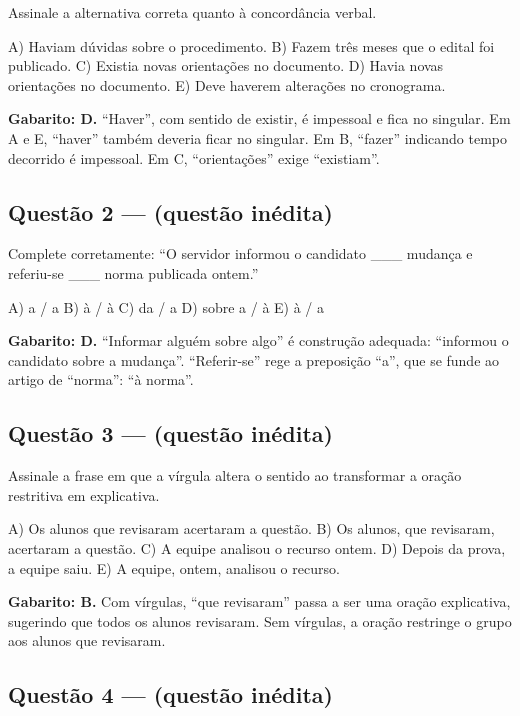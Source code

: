 \documentclass[11pt,a4paper]{article}
\begin{document}
Assinale a alternativa correta quanto à concordância verbal.

A) Haviam dúvidas sobre o procedimento. B) Fazem três meses que o edital foi publicado. C) Existia novas orientações no documento. D) Havia novas orientações no documento. E) Deve haverem alterações no cronograma.

\begin{alerta}
\textbf{Gabarito: D.} “Haver”, com sentido de existir, é impessoal e fica no singular. Em A e E, “haver” também deveria ficar no singular. Em B, “fazer” indicando tempo decorrido é impessoal. Em C, “orientações” exige “existiam”.
\end{alerta}

\subsection*{Questão 2 — (questão inédita)}

Complete corretamente: “O servidor informou o candidato \_\_\_ mudança e referiu-se \_\_\_ norma publicada ontem.”

A) a / a B) à / à C) da / a D) sobre a / à E) à / a

\begin{alerta}
\textbf{Gabarito: D.} “Informar alguém sobre algo” é construção adequada: “informou o candidato sobre a mudança”. “Referir-se” rege a preposição “a”, que se funde ao artigo de “norma”: “à norma”.
\end{alerta}

\subsection*{Questão 3 — (questão inédita)}

Assinale a frase em que a vírgula altera o sentido ao transformar a oração restritiva em explicativa.

A) Os alunos que revisaram acertaram a questão. B) Os alunos, que revisaram, acertaram a questão. C) A equipe analisou o recurso ontem. D) Depois da prova, a equipe saiu. E) A equipe, ontem, analisou o recurso.

\begin{alerta}
\textbf{Gabarito: B.} Com vírgulas, “que revisaram” passa a ser uma oração explicativa, sugerindo que todos os alunos revisaram. Sem vírgulas, a oração restringe o grupo aos alunos que revisaram.
\end{alerta}

\subsection*{Questão 4 — (questão inédita)}
\end{document}

